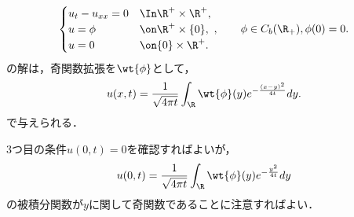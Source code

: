 \documentclass[uplatex,dvipdfmx]{jsarticle}
\begin{document}
\begin{problem}[熱方程式の上半空間上の解公式]
    \[\begin{cases}
        u_t-u_{xx}=0&\In\R^+\times\R^+,\\
        u=\phi&\on\R^+\times\{0\},\\
        u=0&\on\{0\}\times\R^+.
    \end{cases},\qquad\phi\in C_b(\R_+),\phi(0)=0.\]
    の解は，奇関数拡張を$\wt{\phi}$として，
    \[u(x,t)=\frac{1}{\sqrt{4\pi t}}\int_\R\wt{\phi}(y)e^{-\frac{(x-y)^2}{4t}}dy.\]
    で与えられる．
\end{problem}
\begin{Proof}
    3つ目の条件$u(0,t)=0$を確認すればよいが，
    \[u(0,t)=\frac{1}{\sqrt{4\pi t}}\int_\R\wt{\phi}(y)e^{-\frac{y^2}{4t}}dy\]
    の被積分関数が$y$に関して奇関数であることに注意すればよい．
\end{Proof}
\end{document}
